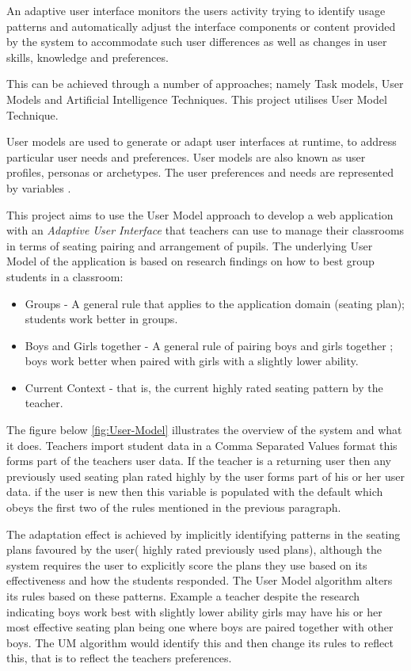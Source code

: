 An adaptive user interface monitors the users activity trying to identify usage patterns and automatically adjust the interface components or content provided by the system to accommodate such user differences as well as changes in user skills, knowledge and preferences.\cite{alvarez2007current}

This can be achieved through a number of approaches; namely Task models, User Models and Artificial Intelligence Techniques. This project utilises User Model Technique. 

User models are used to generate or adapt user interfaces at runtime, to address particular user needs and preferences. User models are also known as user profiles, personas or archetypes. The user preferences and needs are represented by variables \cite{W3C}.

This project aims to use the User Model approach to develop a web application with an \emph{Adaptive User Interface} that teachers can use to manage their classrooms in terms of seating pairing and arrangement of pupils. The underlying User Model of the application is based on research findings on how to best group students in a classroom:

\begin{itemize}
    \item Groups - A general rule that applies to the application domain (seating plan); students work better in groups.
    \item Boys and Girls together - A general rule of pairing boys and girls together ; boys work better when paired with girls with a slightly lower ability. \cite{OFSTED}
    \item Current Context - that is, the current highly rated seating pattern by the teacher. 
\end{itemize}

The figure below \ref{fig:User-Model} illustrates the overview of the system and what it does. Teachers import student data in a Comma Separated Values format this forms part of the teachers user data. If the teacher is a returning user then any previously used seating plan rated highly by the user forms part of his or her user data. if the user is new then this variable is populated with the default which obeys the first two of the rules mentioned in the previous paragraph.

The adaptation effect is achieved by implicitly identifying patterns in the seating plans favoured by the user( highly rated previously used plans), although the system requires the user to explicitly score the plans they use based on its effectiveness and how the students responded. The User Model algorithm alters its rules based on these patterns. Example a teacher despite the research indicating boys work best with slightly lower ability girls may have his or her most effective seating plan being one where boys are paired together with other boys. The UM algorithm would identify this and then change its rules to reflect this, that is to reflect the teachers preferences.

